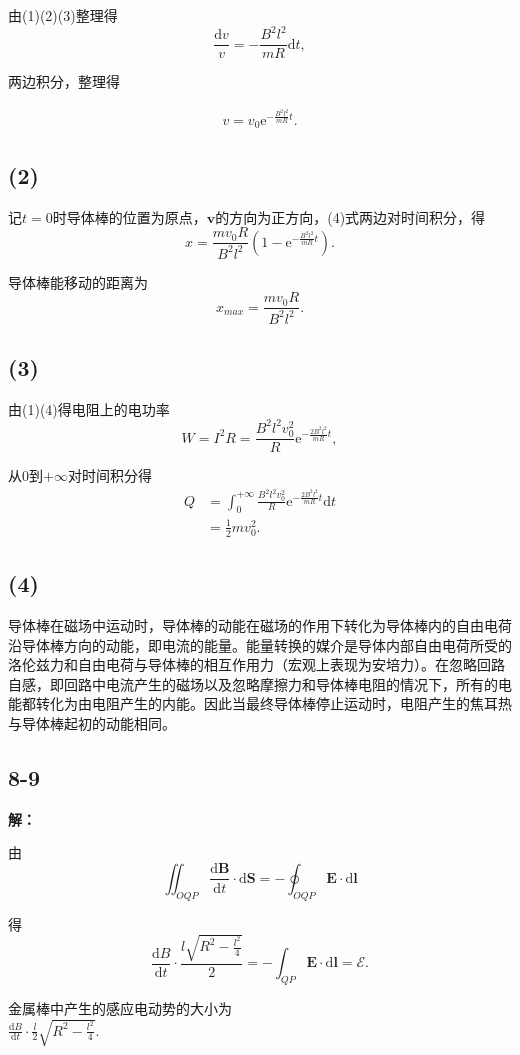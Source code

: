 \documentclass[twocolumn]{ctexart}
\newcommand{\sol}[1]{\subsection*{#1}\noindent\textbf{解：}
	
}
\begin{document}
	由(1)(2)(3)整理得
	$$\frac{\mathrm dv}{v}=-\frac{B^2l^2}{mR}\mathrm dt,$$
	
	两边积分，整理得
	
	\begin{align}v=v_0\mathrm e^{-\frac{B^2l^2}{mR}t}.\end{align}
	
	\subsection*{(2)}
	记$t=0$时导体棒的位置为原点，$\mathbf v$的方向为正方向，(4)式两边对时间积分，得
	$$x=\frac{mv_0R}{B^2l^2}\left(1-\mathrm e^{-\frac{B^2l^2}{mR}t}\right).$$
	
	导体棒能移动的距离为
	$$x_{max}=\frac{mv_0R}{B^2l^2}.$$
	
	\subsection*{(3)}
	由(1)(4)得电阻上的电功率
	$$W=I^2R=\frac{B^2l^2v_0^2}{R}\mathrm e^{-\frac{2B^2l^2}{mR}t},$$
	
	从$0$到$+\infty$对时间积分得
	\begin{align*}
		Q&=\int_{0}^{+\infty}\frac{B^2l^2v_0^2}{R}\mathrm e^{-\frac{2B^2l^2}{mR}t}\mathrm dt\\
		&=\frac{1}{2}mv_0^2.
	\end{align*}
	
	\subsection*{(4)}
	导体棒在磁场中运动时，导体棒的动能在磁场的作用下转化为导体棒内的自由电荷沿导体棒方向的动能，即电流的能量。能量转换的媒介是导体内部自由电荷所受的洛伦兹力和自由电荷与导体棒的相互作用力（宏观上表现为安培力）。在忽略回路自感，即回路中电流产生的磁场以及忽略摩擦力和导体棒电阻的情况下，所有的电能都转化为由电阻产生的内能。因此当最终导体棒停止运动时，电阻产生的焦耳热与导体棒起初的动能相同。
	
	\sol{8-9}
	由
	$$\iint_{OQP}\frac{\mathrm d\mathbf B}{\mathrm dt}\cdot\mathrm d\mathbf S=-\oint_{OQP}\mathbf E\cdot\mathrm d\mathbf l$$
	
	得
	$$\frac{\mathrm dB}{\mathrm dt}\cdot\frac{l\sqrt{R^2-\frac{l^2}{4}}}{2}=-\int_{QP}\mathbf E\cdot\mathrm d\mathbf l=\mathscr E.$$
	
	金属棒中产生的感应电动势的大小为\\$\frac{\mathrm dB}{\mathrm dt}\cdot\frac{l}{2}\sqrt{R^2-\frac{l^2}{4}}$.
\end{document}
